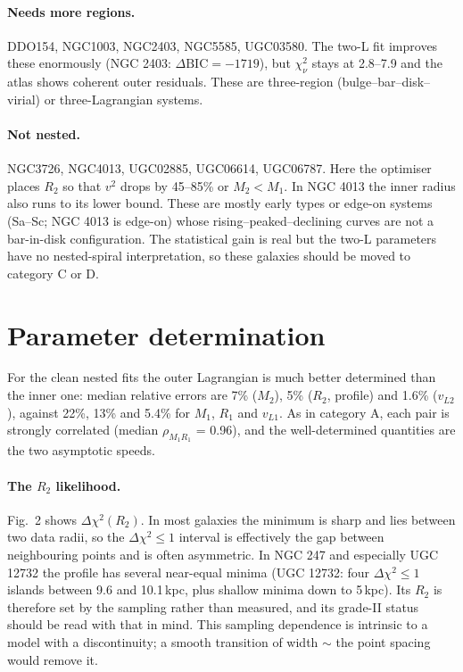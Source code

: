 \documentclass[10pt]{article}
\begin{document}
\paragraph{Needs more regions.} DDO154, NGC1003, NGC2403, NGC5585, UGC03580. The two-L fit improves these enormously (NGC 2403: $\Delta\mathrm{BIC}=-1719$), but $\chi^2_\nu$ stays at 2.8--7.9 and the atlas shows coherent outer residuals. These are three-region (bulge--bar--disk--virial) or three-Lagrangian systems.

\paragraph{Not nested.} NGC3726, NGC4013, UGC02885, UGC06614, UGC06787. Here the optimiser places $R_2$ so that $v^2$ drops by 45--85\% or $M_2<M_1$. In NGC 4013 the inner radius also runs to its lower bound. These are mostly early types or edge-on systems (Sa--Sc; NGC 4013 is edge-on) whose rising--peaked--declining curves are not a bar-in-disk configuration. The statistical gain is real but the two-L parameters have no nested-spiral interpretation, so these galaxies should be moved to category C or D.
\section{Parameter determination}
For the clean nested fits the outer Lagrangian is much better determined than the inner one: median relative errors are 7\% ($M_2$), 5\% ($R_2$, profile) and 1.6\% ($v_{L2}$), against 22\%, 13\% and 5.4\% for $M_1$, $R_1$ and $v_{L1}$. As in category A, each pair is strongly correlated (median $\rho_{M_1R_1}$ = 0.96), and the well-determined quantities are the two asymptotic speeds.

\paragraph{The $R_2$ likelihood.} Fig.~2 shows $\Delta\chi^2(R_2)$. In most galaxies the minimum is sharp and lies between two data radii, so the $\Delta\chi^2\le1$ interval is effectively the gap between neighbouring points and is often asymmetric. In NGC 247 and especially UGC 12732 the profile has several near-equal minima (UGC 12732: four $\Delta\chi^2\le1$ islands between 9.6 and 10.1\,kpc, plus shallow minima down to 5\,kpc). Its $R_2$ is therefore set by the sampling rather than measured, and its grade-II status should be read with that in mind. This sampling dependence is intrinsic to a model with a discontinuity; a smooth transition of width $\sim$ the point spacing would remove it.
\end{document}
